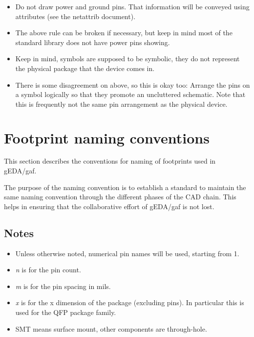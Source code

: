 \documentclass{article}
\begin{document}
\begin{itemize}
\item Do not draw power and ground pins.  That information will be
      conveyed using attributes (see the netattrib document).
\item The above rule can be broken if necessary, but keep in mind most of
      the standard library does not have power pins showing.
\item Keep in mind, symbols are supposed to be symbolic, they do not represent
      the physical package that the device comes in.  
\item There is some disagreement on above, so this is okay too: Arrange
      the pins on a symbol logically so that they promote an uncluttered
      schematic.  Note that this is frequently not the same pin
      arrangement as the physical device.
\end{itemize}

\section{Footprint naming conventions}

This section describes the conventions for naming of footprints used in
gEDA/gaf. 

The purpose of the naming convention is to establish a standard to
maintain the same naming convention through the different phases of the 
CAD chain. This helps in ensuring that the collaborative effort of gEDA/gaf 
is not lost.

\subsection{Notes}
\begin{itemize}
\item  Unless otherwise noted, numerical pin names will be used,
       starting from 1.
\item  {\it n} is for the pin count.
\item  {\it m} is for the pin spacing in mils.
\item  {\it x} is for the x dimension of the package (excluding
       pins).  In particular this is used for the QFP package family.

\item  SMT means surface mount, other components are through-hole.
\end{itemize}
\end{document}
